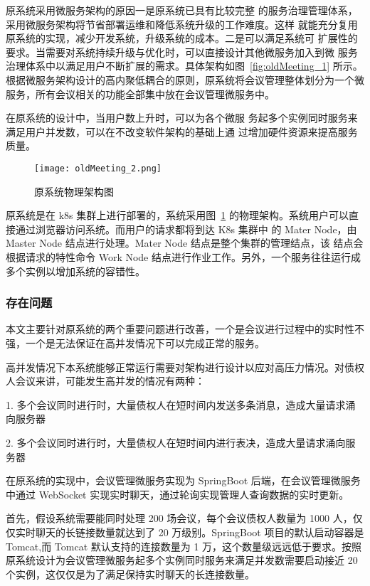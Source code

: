 原系统采用微服务架构的原因一是原系统已具有比较完整
的服务治理管理体系，采用微服务架构将节省部署运维和降低系统升级的工作难度。这样
就能充分复用原系统的实现，减少开发系统，升级系统的成本。二是可以满足系统可
扩展性的要求。当需要对系统持续升级与优化时，可以直接设计其他微服务加入到微
服务治理体系中以满足用户不断扩展的需求。具体架构如图~\ref{fig:oldMeeting_1}\cite{Wang2021} 所示。根据微服务架构设计的高内聚低耦合的原则，原系统将会议管理整体划分为一个微服务，所有会议相关的功能全部集中放在会议管理微服务中。

在原系统的设计中，当用户数上升时，可以为各个微服
务起多个实例同时服务来满足用户并发数，可以在不改变软件架构的基础上通
过增加硬件资源来提高服务质量。

\begin{figure}[!htp]
  \centering
  \texttt{[image: oldMeeting\_2.png]}
  \caption[原物理架构]
    {原系统物理架构图\cite{Wang2021}}
 \label{fig:oldMeeting_2}
\end{figure}

原系统是在 k8s 集群上进行部署的，系统采用图~\ref{fig:oldMeeting_2}
的物理架构。系统用户可以直接通过浏览器访问系统。而用户的请求都将到达 K8s 集群中
的 Mater Node，由 Master Node 结点进行处理。Mater Node 结点是整个集群的管理结点，该
结点会根据请求的特性命令 Work Node 结点进行作业工作。另外，一个服务往往运行成多个实例以增加系统的容错性。


\nocite{Wang2021}
\subsubsection{存在问题}
本文主要针对原系统的两个重要问题进行改善，一个是会议进行过程中的实时性不强，一个是无法保证在高并发情况下可以完成正常的服务。

高并发情况下本系统能够正常运行需要对架构进行设计以应对高压力情况。对债权人会议来讲，可能发生高并发的情况有两种：

1. 多个会议同时进行时，大量债权人在短时间内发送多条消息，造成大量请求涌向服务器

2. 多个会议同时进行时，大量债权人在短时间内进行表决，造成大量请求涌向服务器

在原系统的实现中，会议管理微服务实现为 SpringBoot 后端，在会议管理微服务中通过 WebSocket 实现实时聊天，通过轮询实现管理人查询数据的实时更新。

首先，假设系统需要能同时处理 200 场会议，每个会议债权人数量为 1000 人，仅仅实时聊天的长链接数量就达到了 20 万级别。SpringBoot 项目的默认启动容器是 Tomcat,而 Tomcat 默认支持的连接数量为 1 万，这个数量级远远低于要求。按照原系统设计为会议管理微服务起多个实例同时服务来满足并发数需要启动接近 20 个实例，这仅仅是为了满足保持实时聊天的长连接数量。

